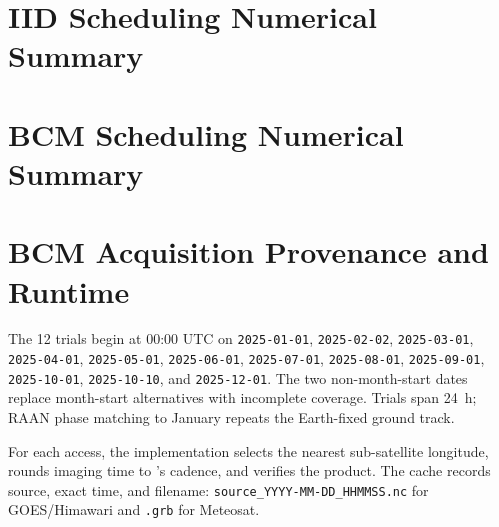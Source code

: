 \section{IID Scheduling Numerical Summary}
\label{sec:appendix_iid_scheduling_summary}

\begin{table}[H]
    \centering
    
    \caption{Paired IID results from : absolute clear-image means and mean $\pm$ SD gap closure and lookahead use.}
    \label{tab:iid_scheduling_summary}
\end{table}
\FloatBarrier

\section{BCM Scheduling Numerical Summary}
\label{sec:appendix_bcm_scheduling_summary}

\begin{table}[H]
    \centering
    
    \caption{Paired BCM results from : absolute clear-image means and mean $\pm$ SD gap closure and lookahead use.}
    \label{tab:bcm_scheduling_summary}
\end{table}
\FloatBarrier

\section{BCM Acquisition Provenance and Runtime}
\label{sec:appendix_bcm_provenance}

The \num{12} trials begin at 00:00 UTC on
\texttt{2025-01-01},
\texttt{2025-02-02},
\texttt{2025-03-01},
\texttt{2025-04-01},
\texttt{2025-05-01},
\texttt{2025-06-01},
\texttt{2025-07-01},
\texttt{2025-08-01},
\texttt{2025-09-01},
\texttt{2025-10-01},
\texttt{2025-10-10}, and
\texttt{2025-12-01}.
The two non-month-start dates replace month-start alternatives with incomplete coverage. Trials span \SI{24}{\hour}; RAAN phase matching to January repeats the Earth-fixed ground track.

For each access, the implementation selects the nearest sub-satellite longitude, rounds imaging time to 's cadence, and verifies the product. The cache records source, exact time, and filename: \texttt{source\_YYYY-MM-DD\_HHMMSS.nc} for GOES/Himawari and \texttt{.grb} for Meteosat.


